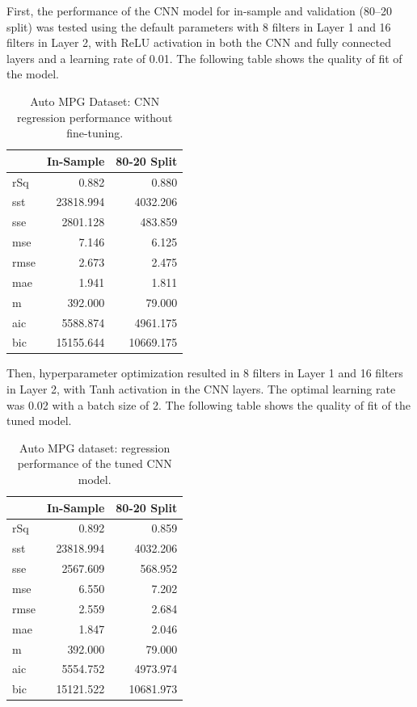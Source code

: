 \documentclass{article}
\begin{document}
First, the performance of the CNN model for in-sample and validation (80–20 split) was tested using the default parameters with 8 filters in Layer 1 and 16 filters in Layer 2, with ReLU activation in both the CNN and fully connected layers and a learning rate of 0.01. The following table shows the quality of fit of the model.

\begin{table}[H]
\centering
\caption{Auto MPG Dataset: CNN regression performance without fine-tuning.}
\label{tab:Auto_MPG_(In-Sample)}
\begin{tabular}{lrr}
\toprule
 & In-Sample & 80-20 Split \\
\midrule
rSq & 0.882 & 0.880 \\
sst & 23818.994 & 4032.206 \\
sse & 2801.128 & 483.859 \\
mse & 7.146 & 6.125 \\
rmse & 2.673 & 2.475 \\
mae & 1.941 & 1.811 \\
m & 392.000 & 79.000 \\
aic & 5588.874 & 4961.175 \\
bic & 15155.644 & 10669.175 \\
\bottomrule
\end{tabular}
\end{table}

Then, hyperparameter optimization resulted in 8 filters in Layer 1 and 16 filters in Layer 2, with Tanh activation in the CNN layers. The optimal learning rate was 0.02 with a batch size of 2. The following table shows the quality of fit of the tuned model.

\begin{table}[H]
\centering
\caption{Auto MPG dataset: regression performance of the tuned CNN model.}
\label{tab:Auto_MPG_(In-Sample)}
\begin{tabular}{lrr}
\toprule
 & In-Sample & 80-20 Split \\
\midrule
rSq & 0.892 & 0.859 \\
sst & 23818.994 & 4032.206 \\
sse & 2567.609 & 568.952 \\
mse & 6.550 & 7.202 \\
rmse & 2.559 & 2.684 \\
mae & 1.847 & 2.046 \\
m & 392.000 & 79.000 \\
aic & 5554.752 & 4973.974 \\
bic & 15121.522 & 10681.973 \\
\bottomrule
\end{tabular}
\end{table}
\end{document}
